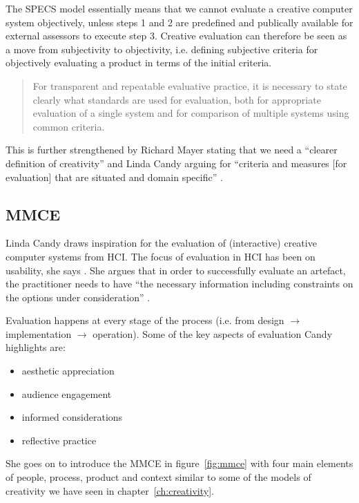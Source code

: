 The \ac{SPECS} model essentially means that we cannot evaluate a creative computer system objectively, unless steps 1 and 2 are predefined and publically available for external assessors to execute step 3. Creative evaluation can therefore be seen as a move from subjectivity to objectivity, i.e. defining subjective criteria for objectively evaluating a product in terms of the initial criteria.

\begin{quotation}
  For transparent and repeatable evaluative practice, it is necessary to state clearly what standards are used for evaluation, both for appropriate evaluation of a single system and for comparison of multiple systems using common criteria. 
\end{quotation}

This is further strengthened by Richard Mayer stating that we need a ``clearer definition of creativity'' \citeyear{Mayer1999} and Linda Candy arguing for ``criteria and measures [for evaluation] that are situated and domain specific'' \citeyear{Candy2012}.


\subsection{MMCE}
\label{s:mmce}

Linda Candy draws inspiration for the evaluation of (interactive) creative computer systems from \ac{HCI}. The focus of evaluation in \ac{HCI} has been on usability, she says \citeyear[p.23]{Candy2012}. She argues that in order to successfully evaluate an artefact, the practitioner needs to have ``the necessary information including constraints on the options under consideration'' \citeyear[p.7]{Candy2012}.

Evaluation happens at every stage of the process (i.e. from design $\to$ implementation $\to$ operation). Some of the key aspects of evaluation Candy highlights are:

\begin{itemize}
  \item aesthetic appreciation
  \item audience engagement
  \item informed considerations
  \item reflective practice
\end{itemize}

She goes on to introduce the \ac{MMCE} in figure~\ref{fig:mmce} with four main elements of people, process, product and context \citeyear[p.11]{Candy2012} similar to some of the models of creativity we have seen in chapter~\ref{ch:creativity}.

